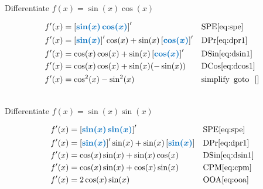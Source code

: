 \documentclass[20150903-160354-rs2.2-MarksMathNotebook.tex]{subfiles}
\begin{document}
\begin{example}[id:20150910-115935] \label{20150910-115935} \hfill \\

Differentiate $f(x)=\sin(x)\cos(x)$

\soln

\solnsteps
\begin{align*}
f'(x) & = \farg{\sin(x)\cos(x)}' && \text{SPE} \eqref{eq:spe} \\
f'(x) & = \farg{\sin(x)}'\cos(x)+ \sin(x)\farg{\cos(x)}' && \text{DPr} \eqref{eq:dpr1} \\
f'(x) & = \cos (x) \cos (x) + \sin(x)\farg{\cos(x)}' && \text{DSin} \eqref{eq:dsin1} \\
f'(x) &= \cos (x) \cos (x) + \sin(x) (-\sin(x)) && \text{DCos} \eqref{eq:dcos1} \\
f'(x) &= \cos^2(x)-\sin^2(x) && \text{simplify} \text{\, goto \,} \, \ref{} %
\end{align*}

\end{example}

\begin{example}[id:20141209-151354] \label{20141209-151354} \hfill \\

Differentiate $f(x)=\sin(x)\sin(x)$

\soln

\solnsteps
\begin{align*}
f'(x) &= \farg{\sin(x)\sin(x)}' && \text{SPE} \eqref{eq:spe} \\
f'(x) &= \farg{\sin(x)}' \sin(x) + \sin (x) \farg{\sin(x)} && \text{DPr} \eqref{eq:dpr1} \\
f'(x) &= \cos(x) \sin(x) + \sin (x) \cos(x) && \text{DSin} \eqref{eq:dsin1} \\
f'(x) &= \cos(x)\sin(x) + \cos(x)\sin(x) && \text{CPM} \eqref{eq:cpm} \\
f'(x) &= 2\cos(x)\sin(x) && \text{OOA} \eqref{eq:ooa} %
\end{align*}
\end{example}
\end{document}
